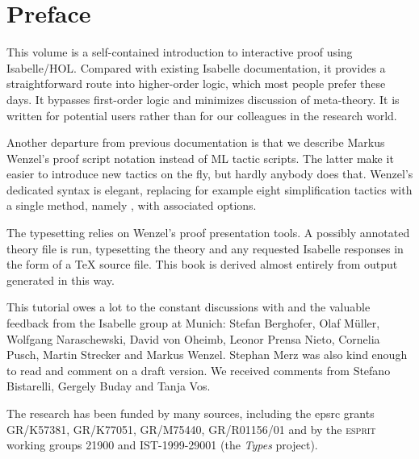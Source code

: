 \chapter*{Preface}

This volume is a self-contained introduction to interactive proof using
Isabelle/HOL\@.  Compared with existing Isabelle documentation, it
provides a straightforward route into higher-order logic, which most
people prefer these days. It bypasses first-order logic and minimizes
discussion of meta-theory.  It is written for potential users rather
than for our colleagues in the research world.

%
Another departure from previous documentation is that we describe Markus
Wenzel's proof script notation instead of ML tactic scripts.  The latter
make it easier to introduce new tactics on the fly, but hardly anybody
does that.  Wenzel's dedicated syntax is elegant, replacing for example
eight simplification tactics with a single method, namely ,
with associated options.

The typesetting relies on Wenzel's proof presentation tools.  A possibly
annotated theory file is run, typesetting the theory and any requested
Isabelle responses in the form of a \TeX{} source file.  This book is
derived almost entirely from output generated in this way.

This tutorial owes a lot to the constant discussions with and the valuable
feedback from the Isabelle group at Munich: Stefan Berghofer, Olaf M{\"u}ller,
Wolfgang Naraschewski, David von Oheimb, Leonor Prensa Nieto, Cornelia Pusch,
Martin Strecker and Markus Wenzel. Stephan Merz was also kind enough to
read and comment on a draft version.  We received comments from Stefano
Bistarelli, Gergely Buday and Tanja Vos.

The research has been funded by many sources, including the {\sc epsrc} 
grants  GR\slash K57381, GR\slash K77051,
GR\slash M75440, GR\slash R01156\slash 01 and by the \textsc{esprit} 
working groups 21900 and IST-1999-29001 (the \emph{Types} project).
